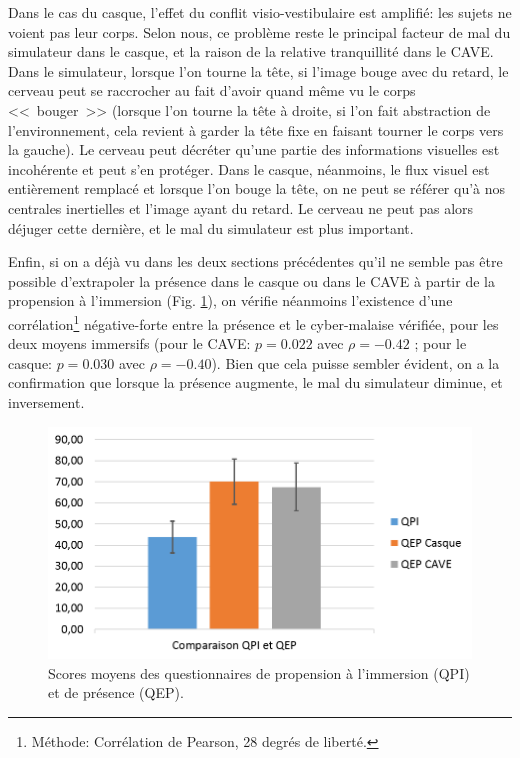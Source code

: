 	\par Dans le cas du casque, l'effet du conflit visio-vestibulaire est amplifié: les sujets ne voient pas leur corps. Selon nous, ce problème reste le principal facteur de mal du simulateur dans le casque, et la raison de la relative tranquillité dans le CAVE. Dans le simulateur, lorsque l'on tourne la tête, si l'image bouge avec du retard, le cerveau peut se raccrocher au fait d'avoir quand même vu le corps <<~bouger~>> (lorsque l'on tourne la tête à droite, si l'on fait abstraction de l'environnement, cela revient à garder la tête fixe en faisant tourner le corps vers la gauche). Le cerveau peut décréter qu'une partie des informations visuelles est incohérente et peut s'en protéger. Dans le casque, néanmoins, le flux visuel est entièrement remplacé et lorsque l'on bouge la tête, on ne peut se référer qu'à nos centrales inertielles et l'image ayant du retard. Le cerveau ne peut pas alors déjuger cette dernière, et le mal du simulateur est plus important.
	
	\par Enfin, si on a déjà vu dans les deux sections précédentes qu'il ne semble pas être possible d'extrapoler la présence dans le casque ou dans le CAVE à partir de la propension à l'immersion (Fig. \ref{fig:itq_pq}), on vérifie néanmoins l'existence d'une corrélation\footnote{Méthode: Corrélation de Pearson, 28 degrés de liberté.} négative-forte entre la présence et le cyber-malaise vérifiée, pour les deux moyens immersifs (pour le CAVE: $p = 0.022$ avec $\rho = -0.42$ ; pour le casque: $p = 0.030$ avec $\rho = -0.40$). Bien que cela puisse sembler évident, on a la confirmation que lorsque la présence augmente, le mal du simulateur diminue, et inversement.
	
	\begin{figure}
		\centering
		\includegraphics[width=0.8\linewidth]{Figures/ITQvPQ.png}
		\caption{Scores moyens des questionnaires de propension à l'immersion (QPI) et de présence (QEP).}
		\label{fig:itq_pq}
	\end{figure}
	
